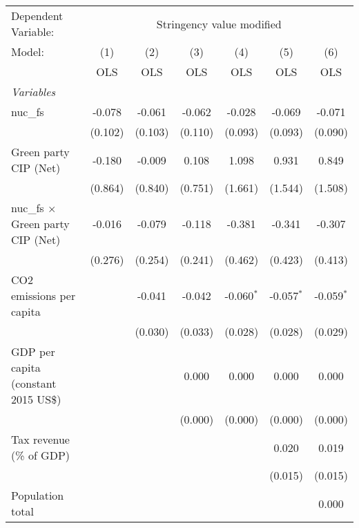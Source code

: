 
\begingroup
\centering
\begin{tabular}{lcccccc}
   \toprule
   Dependent Variable: & \multicolumn{6}{c}{Stringency value modified}\\
   Model:                                   & (1)     & (2)     & (3)     & (4)          & (5)          & (6)\\  
                                            &  OLS    & OLS     & OLS     & OLS          & OLS          & OLS\\  
   \midrule
   \emph{Variables}\\
   nuc\_fs                                  & -0.078  & -0.061  & -0.062  & -0.028       & -0.069       & -0.071\\   
                                            & (0.102) & (0.103) & (0.110) & (0.093)      & (0.093)      & (0.090)\\   
   Green party CIP (Net)                    & -0.180  & -0.009  & 0.108   & 1.098        & 0.931        & 0.849\\   
                                            & (0.864) & (0.840) & (0.751) & (1.661)      & (1.544)      & (1.508)\\   
   nuc\_fs $\times$ Green party CIP (Net)   & -0.016  & -0.079  & -0.118  & -0.381       & -0.341       & -0.307\\   
                                            & (0.276) & (0.254) & (0.241) & (0.462)      & (0.423)      & (0.413)\\   
   CO2 emissions per capita                 &         & -0.041  & -0.042  & -0.060$^{*}$ & -0.057$^{*}$ & -0.059$^{*}$\\   
                                            &         & (0.030) & (0.033) & (0.028)      & (0.028)      & (0.029)\\   
   GDP per capita (constant 2015 US\$)      &         &         & 0.000   & 0.000        & 0.000        & 0.000\\   
                                            &         &         & (0.000) & (0.000)      & (0.000)      & (0.000)\\   
   Tax revenue (\% of GDP)                  &         &         &         &              & 0.020        & 0.019\\   
                                            &         &         &         &              & (0.015)      & (0.015)\\   
   Population total                         &         &         &         &              &              & 0.000\\   

\end{tabular}

